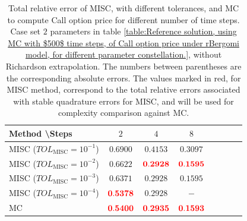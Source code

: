 \FloatBarrier
\begin{table}[h!]
	\centering
	\begin{tabular}{l*{6}{c}r}
		Method \textbackslash  Steps            & $2$ & $4$ & $8$   \\
		\hline
		MISC ($TOL_{\text{MISC}}=10^{-1}$)  & $\mathbf{
			0.6900}$& $\mathbf{    
			0.4153}$ & $\mathbf{     
			0.3097
		}$   \\
		MISC ($TOL_{\text{MISC}}=10^{-2}$)  & $\mathbf{ 
			0.6622}$ & $\mathbf{  {\color{red} 
				0.2928
			}
		}$ & $\mathbf{ {\color{red}    0.1595}}$   \\
		MISC ($TOL_{\text{MISC}}=10^{-3}$)        & $\mathbf{
			0.6371}$  &  $\mathbf{
			0.2928
		}$ &  $\mathbf{    0.1595}$ \\
		MISC ($TOL_{\text{MISC}}=10^{-4}$)        & $\mathbf{       {\color{red}0.5378}}$  & $\mathbf{
			0.2928
		}$  &  $-$ \\
		\hline
		MC    & $\mathbf{{\color{red}    0.5400}}$  & $\mathbf{{\color{red}0.2935}
		}$  &$\mathbf{{\color{red}
				0.1593}}$  \\	
		
		\hline
	\end{tabular}
	\caption{Total relative error of MISC, with different tolerances, and MC to compute Call option price  for different number of time steps. Case  set $2$ parameters in table \ref{table:Reference solution, using MC with $500$ time steps, of Call option price under rBergomi model, for different parameter constellation.}, without Richardson extrapolation. The numbers between parentheses are the corresponding absolute errors. The values marked in red, for MISC method, correspond to the total relative errors associated with  stable quadrature errors for MISC, and will be used for complexity comparison against MC.}
	\label{Total error of MISC and MC to compute Call option price of the different tolerances for different number of time steps. Case $K=1$, $H=0.07$, without Richardson extrapolation. The numbers between parentheses are the corresponding absolute errors,linear}
\end{table}

